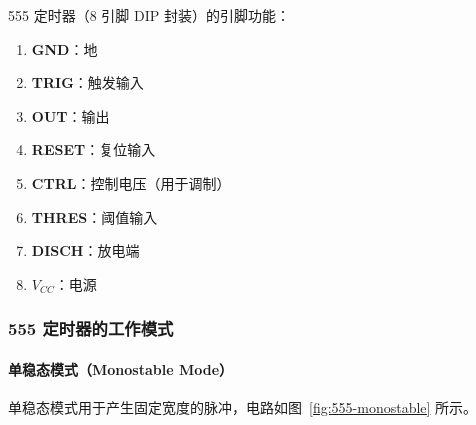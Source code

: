 555 定时器（8 引脚 DIP 封装）的引脚功能：
\begin{enumerate}
  \item \textbf{GND}：地
  \item \textbf{TRIG}：触发输入
  \item \textbf{OUT}：输出
  \item \textbf{RESET}：复位输入
  \item \textbf{CTRL}：控制电压（用于调制）
  \item \textbf{THRES}：阈值输入
  \item \textbf{DISCH}：放电端
  \item \textbf{$V_{CC}$}：电源
\end{enumerate}

\subsubsection{555 定时器的工作模式}

\paragraph{单稳态模式（Monostable Mode）}

单稳态模式用于产生固定宽度的脉冲，电路如图~\ref{fig:555-monostable} 所示。





